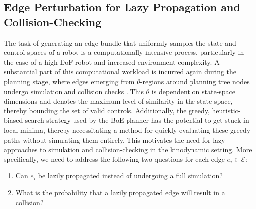 

\subsection{Edge Perturbation for Lazy Propagation and Collision-Checking}\label{sec:methods-perturbation}

The task of generating an edge bundle that uniformly samples the state and control spaces of a robot is a computationally intensive process, particularly in the case of a high-DoF robot and increased environment complexity.
A substantial part of this computational workload is incurred again during the planning stage, where edges emerging from $\theta$-regions around planning tree nodes undergo simulation and collision checks \cite{shome2021asymptotically}. This $\theta$ is dependent on state-space dimensions and denotes the maximum level of similarity in the state space, thereby bounding the set of valid controls.
Additionally, the greedy, heuristic-biased search strategy used by the BoE planner has the potential to get stuck in local minima, thereby necessitating a method for quickly evaluating these greedy paths without simulating them entirely. This motivates the need for lazy approaches to simulation and collision-checking in the kinodynamic setting.
More specifically, we need to address the following two questions for each edge $e_i \in \mathcal{E}$:
\begin{enumerate}
    \item Can $e_i$ be lazily propagated instead of undergoing a full simulation?
    \item What is the probability that a lazily propagated edge will result in a collision?
\end{enumerate}

